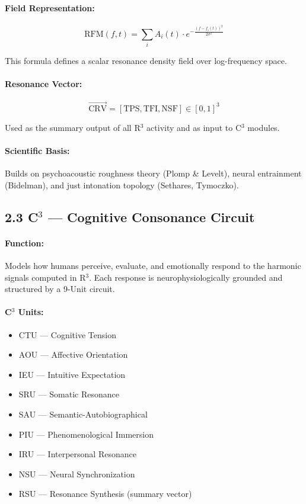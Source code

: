 \documentclass[10pt]{article}
\begin{document}
\paragraph{Field Representation:}

\[
\text{RFM}(f, t) = \sum_i A_i(t) \cdot e^{-\frac{(f - f_i(t))^2}{2\sigma^2}}
\]

This formula defines a scalar resonance density field over log-frequency space.

\paragraph{Resonance Vector:}
\[
\vec{\text{CRV}} = [\text{TPS}, \text{TFI}, \text{NSF}] \in [0,1]^3
\]

Used as the summary output of all R$^{3}$ activity and as input to C$^{3}$ modules.

\paragraph{Scientific Basis:}  
Builds on psychoacoustic roughness theory (Plomp & Levelt), neural entrainment (Bidelman), and just intonation topology (Sethares, Tymoczko).

\subsection*{2.3 C$^{3}$ — Cognitive Consonance Circuit}

\paragraph{Function:}  
Models how humans perceive, evaluate, and emotionally respond to the harmonic signals computed in R$^{3}$. Each response is neurophysiologically grounded and structured by a 9-Unit circuit.

\paragraph{C$^{3}$ Units:}

\begin{itemize}
  \item CTU — Cognitive Tension
  \item AOU — Affective Orientation
  \item IEU — Intuitive Expectation
  \item SRU — Somatic Resonance
  \item SAU — Semantic-Autobiographical
  \item PIU — Phenomenological Immersion
  \item IRU — Interpersonal Resonance
  \item NSU — Neural Synchronization
  \item RSU — Resonance Synthesis (summary vector)
\end{itemize}
\end{document}
